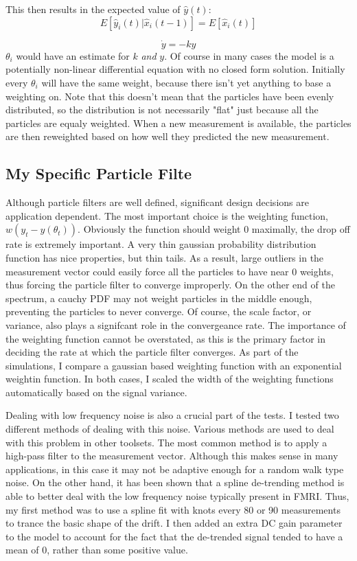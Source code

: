 \documentclass{article}
\begin{document}
This
then results in the expected value of $\hat{y}(t)$:
\begin{equation}
E[\hat{y}_i(t) | \hat{x}_i(t-1)] = E[\hat{x}_i(t)]
\end{equation}

\begin{equation}
\dot{y} = -ky
\end{equation}
$\theta_i$ would have an estimate for $k$ \emph{and} $y$. Of course in many cases
the model is a potentially non-linear differential equation with no closed
form solution. Initially every $\theta_i$ will have the same weight, because
there isn't yet anything to base a weighting on. Note that this doesn't mean
that the particles have been evenly distributed, so the distribution is not 
necessarily "flat" just because all the particles are equaly weighted. When a
new measurement is available, the particles are then reweighted based on how
well they predicted the new measurement. 

\subsection*{My Specific Particle Filte}
Although particle filters are well defined, significant design decisions
are application dependent. The most important choice is the weighting function,
$w(y_t - y(\theta_t))$. Obviously the function should weight $0$ maximally,
the drop off rate is extremely important. A very thin gaussian probability 
distribution function has nice properties, but thin tails. As a result, large
outliers in the measurement vector could easily force all the particles to
have near 0 weights, thus forcing the particle filter to converge improperly. 
On the other end of the spectrum, a cauchy PDF may not
weight particles in the middle enough, preventing the particles to never 
converge. Of course, the scale factor, or variance, also plays a signifcant
role in the convergeance rate. The importance of the weighting function
cannot be overstated, as this is the primary factor in deciding the rate at
which the particle filter converges. As part of the simulations, I compare
a gaussian based weighting function with an exponential weightin function.
In both cases, I scaled the width of the weighting functions automatically based
on the signal variance.

Dealing with low frequency noise is also a crucial part of the tests. 
I tested two different methods of dealing with this noise. Various methods
are used to deal with this problem in other toolsets. The most common method
is to apply a high-pass filter to the measurement vector. Although this makes
sense in many applications, in this case it may not be adaptive enough for
a random walk type noise. On the other hand, it has been shown that a spline
de-trending method is able to better deal with the low frequency noise
typically present in FMRI. Thus, my first method
was to use a spline fit with knots every 80 or 90 measurements to trance
the basic shape of the drift. I then added an extra DC gain parameter to
the model to account for the fact that the de-trended signal tended to have 
a mean of 0, rather than some positive value. 
\end{document}
